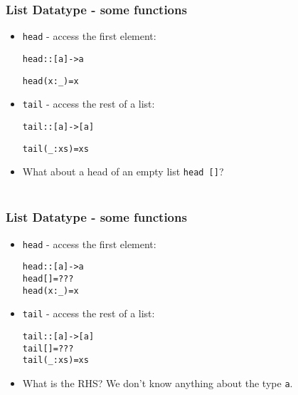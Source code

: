 \documentclass[final,handout]{beamer}
\begin{document}
\begin{frame}[fragile]
    \frametitle{List Datatype \text{[a]} - some functions}

    \begin{itemize}
        \item<1-> \texttt{head} - access the first element:
    \begin{alltt}
    head :: [a] -> a 
    
    head (x : _) = x
    \end{alltt}

        \item<2-> \texttt{tail} - access the rest of a list:
    \begin{alltt}
    tail :: [a] -> [a]
    
    tail (_ : xs) = xs
    \end{alltt}

    \item<3-> What about a head of an empty list \texttt{head []}? \\
        ~\\

    \end{itemize}


\end{frame}

\begin{frame}[fragile]
    \frametitle{List Datatype \text{[a]} - some functions}

    \begin{itemize}
        \item \texttt{head} - access the first element:
    \begin{alltt}
    head :: [a] -> a 
    head []      = ???
    head (x : _) = x
    \end{alltt}

        \item \texttt{tail} - access the rest of a list:
    \begin{alltt}
    tail :: [a] -> [a]
    tail []       = ???
    tail (_ : xs) = xs
    \end{alltt}

    \item What is the RHS? We don't know anything about the type \texttt{a}.

    \end{itemize}


\end{frame}
\end{document}
